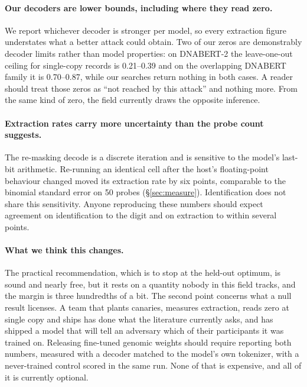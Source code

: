 \paragraph{Our decoders are lower bounds, including where they read zero.}
We report whichever decoder is stronger per model, so every extraction figure understates what a
better attack could obtain. Two of our zeros are demonstrably decoder limits rather than model
properties: on DNABERT-2 the leave-one-out ceiling for single-copy records is 0.21--0.39 and on the
overlapping DNABERT family it is 0.70--0.87, while our searches return nothing in both cases. A reader
should treat those zeros as ``not reached by this attack'' and nothing more. From the same kind of
zero, the field currently draws the opposite inference.

\paragraph{Extraction rates carry more uncertainty than the probe count suggests.}
The re-masking decode is a discrete iteration and is sensitive to the model's last-bit arithmetic.
Re-running an identical cell after the host's floating-point behaviour changed moved its extraction
rate by six points, comparable to the binomial standard error on 50 probes (\S\ref{sec:measure}).
Identification does not share this sensitivity. Anyone reproducing these numbers should expect
agreement on identification to the digit and on extraction to within several points.

\paragraph{What we think this changes.}
The practical recommendation, which is to stop at the held-out optimum, is sound and nearly free,
but it rests on a quantity nobody in this field tracks, and the margin is three hundredths of a bit.
The second point concerns what a null result licenses. A team that plants canaries, measures extraction, reads
zero at single copy and ships has done what the literature currently asks, and has shipped a model
that will tell an adversary which of their participants it was trained on. Releasing fine-tuned
genomic weights should require reporting both numbers, measured with a decoder matched to the model's
own tokenizer, with a never-trained control scored in the same run. None of that is expensive, and
all of it is currently optional.
